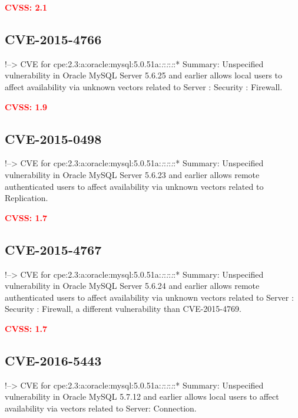\documentclass[a4paper, 12pt]{article}
\begin{document}
\textbf{\textcolor{red}{CVSS: 2.1}}

\hypertarget{cve-2015-4766}{%
\subsection{CVE-2015-4766}\label{cve-2015-4766}}

!--\textgreater{} CVE for
cpe:2.3:a:oracle:mysql:5.0.51a:\emph{:}:\emph{:}:\emph{:}:* Summary:
Unspecified vulnerability in Oracle MySQL Server 5.6.25 and earlier
allows local users to affect availability via unknown vectors related to
Server : Security : Firewall.

\textbf{\textcolor{red}{CVSS: 1.9}}

\hypertarget{cve-2015-0498}{%
\subsection{CVE-2015-0498}\label{cve-2015-0498}}

!--\textgreater{} CVE for
cpe:2.3:a:oracle:mysql:5.0.51a:\emph{:}:\emph{:}:\emph{:}:* Summary:
Unspecified vulnerability in Oracle MySQL Server 5.6.23 and earlier
allows remote authenticated users to affect availability via unknown
vectors related to Replication.

\textbf{\textcolor{red}{CVSS: 1.7}}

\hypertarget{cve-2015-4767}{%
\subsection{CVE-2015-4767}\label{cve-2015-4767}}

!--\textgreater{} CVE for
cpe:2.3:a:oracle:mysql:5.0.51a:\emph{:}:\emph{:}:\emph{:}:* Summary:
Unspecified vulnerability in Oracle MySQL Server 5.6.24 and earlier
allows remote authenticated users to affect availability via unknown
vectors related to Server : Security : Firewall, a different
vulnerability than CVE-2015-4769.

\textbf{\textcolor{red}{CVSS: 1.7}}

\hypertarget{cve-2016-5443}{%
\subsection{CVE-2016-5443}\label{cve-2016-5443}}

!--\textgreater{} CVE for
cpe:2.3:a:oracle:mysql:5.0.51a:\emph{:}:\emph{:}:\emph{:}:* Summary:
Unspecified vulnerability in Oracle MySQL 5.7.12 and earlier allows
local users to affect availability via vectors related to Server:
Connection.
\end{document}
